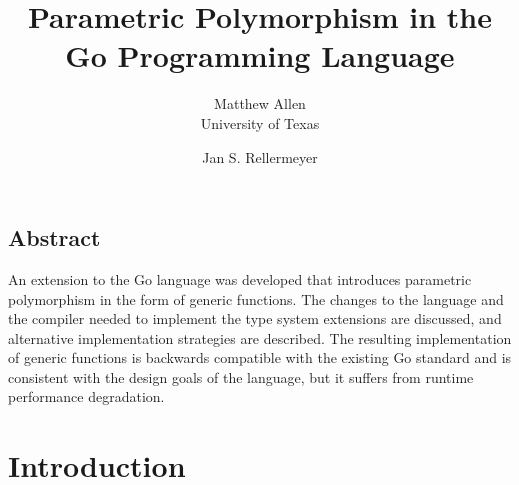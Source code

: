 \documentclass[letterpaper,twocolumn,11pt]{article}
\begin{document}
\date{}

\title{\Large \bf Parametric Polymorphism in the Go Programming Language}

\author{
  {\rm Matthew Allen}\\
  University of Texas
  \and
  {\rm Jan S. Rellermeyer}
}

\maketitle

\thispagestyle{empty}


\subsection*{Abstract}
An extension to the Go language was developed that introduces parametric polymorphism in the form of generic functions. The changes to the language and the compiler needed to implement the type system extensions are discussed, and alternative implementation strategies are described. The resulting implementation of generic functions is backwards compatible with the existing Go standard and is consistent with the design goals of the language, but it suffers from runtime performance degradation. 

\section{Introduction} \label{introduction}
\end{document}
